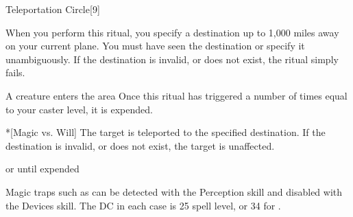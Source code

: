 \begin{spellsection}{Teleportation Circle}[9]
    \begin{spellheader}
    \end{spellheader}
    \begin{spellcontent}
        \begin{spelltargetinginfo}
        \end{spelltargetinginfo}
        \begin{spelleffects}

            \spellspecial When you perform this ritual, you specify a destination up to 1,000 miles away on your current plane. You must have seen the destination or specify it unambiguously. If the destination is invalid, or does not exist, the ritual simply fails.
            \begin{spelltrigger}{A creature enters the area}
                \spellspecial Once this ritual has triggered a number of times equal to your caster level, it is expended.
                \begin{spelltarget}*[Magic vs. Will]
                    \spelleffect The target is teleported to the specified destination. If the destination is invalid, or does not exist, the target is unaffected.
                \end{spelltarget}
            \end{spelltrigger}

            \spelldur \durext or until expended \dismissable
        \end{spelleffects}
    \end{spellcontent}
    \begin{spellfooter}
        \spellnotes Magic traps such as  can be detected with the Perception skill and disabled with the Devices skill. The DC in each case is 25 \add spell level, or 34 for .
    \end{spellfooter}
\end{spellsection}

